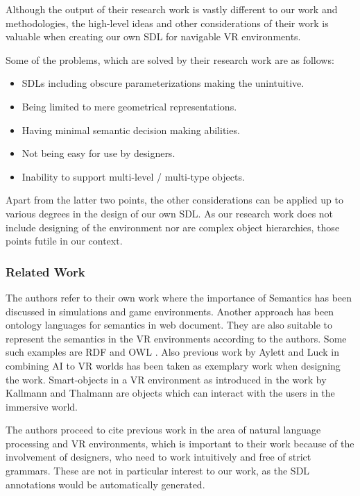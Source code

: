 Although the output of their research work is vastly different to our work and methodologies, the high-level ideas and other considerations of their work is valuable when creating our own SDL for navigable VR environments.

Some of the problems, which are solved by their research work are as follows:

\begin{itemize}
\item{SDLs including obscure parameterizations making the unintuitive.}
\item{Being limited to mere geometrical representations.}
\item{Having minimal semantic decision making abilities.}
\item{Not being easy for use by designers.}
\item{Inability to support multi-level / multi-type objects.}
\end{itemize}

Apart from the latter two points, the other considerations can be applied up to various degrees in the design of our own SDL. As our research work does not include designing of the environment nor are complex object hierarchies, those points futile in our context.

\subsubsection{Related Work}
The authors refer to their own work \cite{Tutenel2008} where the importance of Semantics has been discussed in simulations and game environments. Another approach has been ontology languages for semantics in web document. They are also suitable to represent the semantics in the VR environments according to the authors. Some such examples are RDF \cite{rdf} and OWL \cite{owl}. Also previous work by Aylett and Luck \cite{Aylett00applyingartificial} in combining AI to VR worlds has been taken as exemplary work when designing the work. Smart-objects in a VR environment as introduced in the work by Kallmann and Thalmann \cite{Kallmann99} are objects which can interact with the users in the immersive world.

The authors proceed to cite previous work in the area of natural language processing and VR environments, which is important to their work because of the involvement of designers, who need to work intuitively and free of strict grammars. These are not in particular interest to our work, as the SDL annotations would be automatically generated.


